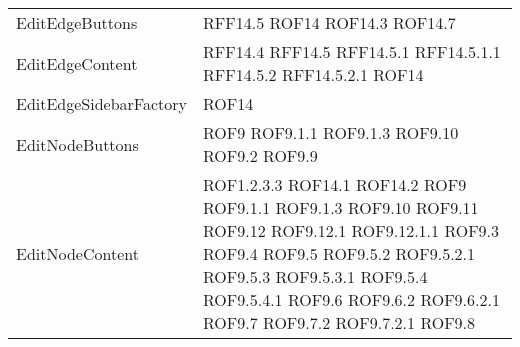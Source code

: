 \begin{longtable}{p{5cm}!{\VRule[1pt]}p{2.5cm}}
	EditEdgeButtons & RFF14.5 \newline ROF14 \newline ROF14.3 \newline ROF14.7\\
	EditEdgeContent & RFF14.4 \newline RFF14.5 \newline RFF14.5.1 \newline RFF14.5.1.1 \newline RFF14.5.2 \newline RFF14.5.2.1 \newline ROF14\\
	EditEdgeSidebarFactory & ROF14\\
	EditNodeButtons & ROF9 \newline ROF9.1.1 \newline ROF9.1.3 \newline ROF9.10 \newline ROF9.2 \newline ROF9.9\\
	EditNodeContent & ROF1.2.3.3 \newline ROF14.1 \newline ROF14.2 \newline ROF9 \newline ROF9.1.1 \newline ROF9.1.3 \newline ROF9.10 \newline ROF9.11 \newline ROF9.12 \newline ROF9.12.1 \newline ROF9.12.1.1 \newline ROF9.3 \newline ROF9.4 \newline ROF9.5 \newline ROF9.5.2 \newline ROF9.5.2.1 \newline ROF9.5.3 \newline ROF9.5.3.1 \newline ROF9.5.4 \newline ROF9.5.4.1 \newline ROF9.6 \newline ROF9.6.2 \newline ROF9.6.2.1 \newline ROF9.7 \newline ROF9.7.2 \newline ROF9.7.2.1 \newline ROF9.8\\

\end{longtable}
